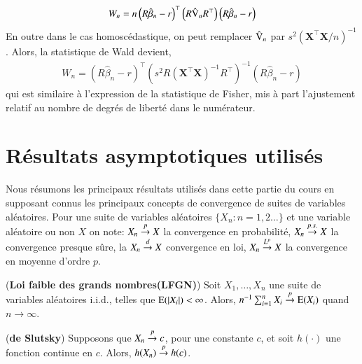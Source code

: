 \documentclass[10pt, reqno]{amsart}
\begin{document}
\begin{align*}
W_n = n\left(R\hat{\beta}_n- r\right)^\top\left(R\hat{\operatorname{V}}_nR^\top\right)\left(R\hat{\beta}_n- r\right)
\end{align*}
En outre dans le cas homoscédastique, on peut remplacer $\hat{\operatorname{V}}_n$ par $s^2(\mathbf{X}^\top\mathbf{X}/n)^{-1}$. Alors, la statistique de Wald devient,
\begin{align*}
W_n = \left(R\hat{\beta}_n- r\right)^\top\left(s^2R(\mathbf{X}^\top\mathbf{X})^{-1}R^\top\right)^{-1}\left(R\hat{\beta}_n-r\right)
\end{align*}
qui est similaire à l'expression de la statistique de Fisher, mis à part l'ajustement relatif au nombre de degrés de liberté dans le numérateur.


\newpage


\appendix

\section{Résultats asymptotiques utilisés}

Nous résumons les principaux résultats utilisés dans cette partie du cours en supposant connus les principaux concepts de 
convergence de suites de variables aléatoires. Pour une suite de variables aléatoires 
$\{X_n: n = 1, 2\ldots\}$ et une variable aléatoire ou non $X$ on note: $X_n\overset{p}{\rightarrow} X$ 
la convergence en probabilité, $X_n\overset{p.s.}{\rightarrow} X$ la convergence presque sûre, la $X_n\overset{d}{\rightarrow} X$
convergence en loi, $X_n\overset{L^p}{\rightarrow} X$ la convergence en moyenne d'ordre $p$.

\begin{theoreme}(\textbf{Loi faible des grands nombres(LFGN)})
    Soit $X_1, \ldots, X_n$ une suite de variables aléatoires i.i.d., telles que $\operatorname{E}(\left\vert {X_i} \right\vert) <\infty$. Alors, 
    $n^{-1}\sum_{i=1}^n X_i\overset{p}{\rightarrow} \operatorname{E}(X_i)$ quand $n\to\infty$.
\end{theoreme}

\begin{theoreme}(\textbf{de Slutsky})
Supposons que $X_n \overset{p}{\rightarrow} c$, pour une constante $c$, et soit $h(\cdot)$ une fonction continue en $c$. Alors, 
$h(X_n)\overset{p}{\rightarrow} h(c)$.
\end{theoreme}
\end{document}
